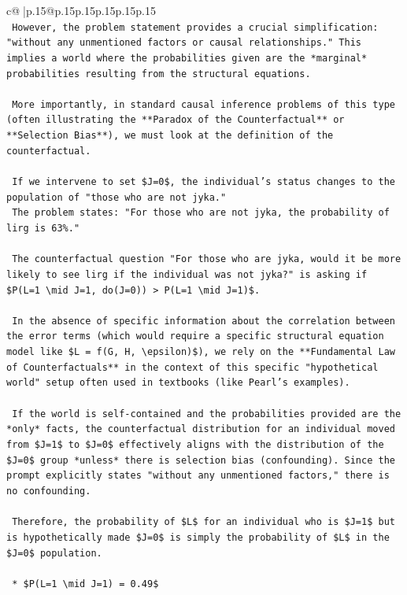 \documentclass{article}
\begin{document}
{\begin{supertabular}{c@{$\;$}|p{.15\linewidth}@{}p{.15\linewidth}p{.15\linewidth}p{.15\linewidth}p{.15\linewidth}p{.15\linewidth}}
{{{\\ 
\texttt{    However, the problem statement provides a crucial simplification: "without any unmentioned factors or causal relationships." This implies a world where the probabilities given are the *marginal* probabilities resulting from the structural equations.} \\
\\ 
\texttt{    More importantly, in standard causal inference problems of this type (often illustrating the **Paradox of the Counterfactual** or **Selection Bias**), we must look at the definition of the counterfactual.} \\
\\ 
\texttt{    If we intervene to set \$J=0\$, the individual's status changes to the population of "those who are not jyka."} \\
\texttt{    The problem states: "For those who are not jyka, the probability of lirg is 63\%."} \\
\\ 
\texttt{    The counterfactual question "For those who are jyka, would it be more likely to see lirg if the individual was not jyka?" is asking if \$P(L=1 \textbackslash{}mid J=1, do(J=0)) > P(L=1 \textbackslash{}mid J=1)\$.} \\
\\ 
\texttt{    In the absence of specific information about the correlation between the error terms (which would require a specific structural equation model like \$L = f(G, H, \textbackslash{}epsilon)\$), we rely on the **Fundamental Law of Counterfactuals** in the context of this specific "hypothetical world" setup often used in textbooks (like Pearl's examples).} \\
\\ 
\texttt{    If the world is self{-}contained and the probabilities provided are the *only* facts, the counterfactual distribution for an individual moved from \$J=1\$ to \$J=0\$ effectively aligns with the distribution of the \$J=0\$ group *unless* there is selection bias (confounding). Since the prompt explicitly states "without any unmentioned factors," there is no confounding.} \\
\\ 
\texttt{    Therefore, the probability of \$L\$ for an individual who is \$J=1\$ but is hypothetically made \$J=0\$ is simply the probability of \$L\$ in the \$J=0\$ population.} \\
\\ 
\texttt{    *   \$P(L=1 \textbackslash{}mid J=1) = 0.49\$} \\
}}}
\end{supertabular}}
\end{document}
